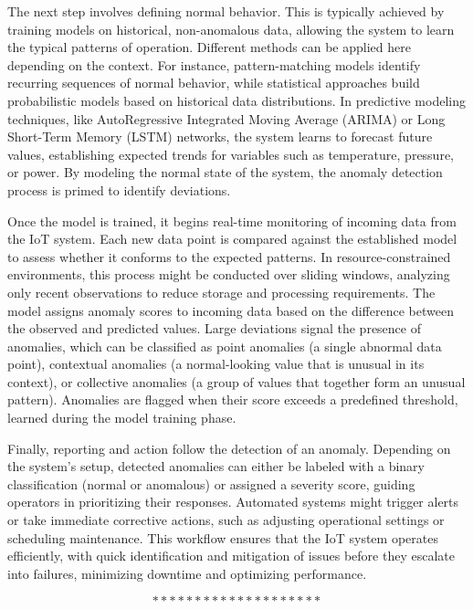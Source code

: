 The next step involves defining normal behavior. This is typically achieved by training models on historical, non-anomalous data, allowing the system to learn the typical patterns of operation. Different methods can be applied here depending on the context. For instance, pattern-matching models identify recurring sequences of normal behavior, while statistical approaches build probabilistic models based on historical data distributions. In predictive modeling techniques, like AutoRegressive Integrated Moving Average (ARIMA) or Long Short-Term Memory (LSTM) networks, the system learns to forecast future values, establishing expected trends for variables such as temperature, pressure, or power. By modeling the normal state of the system, the anomaly detection process is primed to identify deviations.

Once the model is trained, it begins real-time monitoring of incoming data from the IoT system. Each new data point is compared against the established model to assess whether it conforms to the expected patterns. In resource-constrained environments, this process might be conducted over sliding windows, analyzing only recent observations to reduce storage and processing requirements. The model assigns anomaly scores to incoming data based on the difference between the observed and predicted values. Large deviations signal the presence of anomalies, which can be classified as point anomalies (a single abnormal data point), contextual anomalies (a normal-looking value that is unusual in its context), or collective anomalies (a group of values that together form an unusual pattern). Anomalies are flagged when their score exceeds a predefined threshold, learned during the model training phase.

Finally, reporting and action follow the detection of an anomaly. Depending on the system's setup, detected anomalies can either be labeled with a binary classification (normal or anomalous) or assigned a severity score, guiding operators in prioritizing their responses. Automated systems might trigger alerts or take immediate corrective actions, such as adjusting operational settings or scheduling maintenance. This workflow ensures that the IoT system operates efficiently, with quick identification and mitigation of issues before they escalate into failures, minimizing downtime and optimizing performance\cite{77}.

$$********************$$

